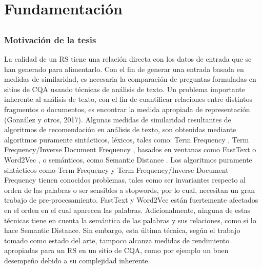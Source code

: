 \chapter*{Fundamentación}\label{ch:fundamentacion}

\section*{}
\addtocounter{section}{1}
\setcounter{subsection}{0}

\subsection{Motivación de la tesis}
 La calidad de un RS tiene una relación directa con los datos de entrada que se han generado para alimentarlo. Con el fin de generar una entrada basada en medidas de similaridad, es necesaria la comparación de preguntas formuladas en sitios de CQA usando técnicas de análisis de texto. Un problema importante inherente al análisis de texto, con el fin de cuantificar relaciones entre distintos fragmentos o documentos, es encontrar la medida apropiada de representación (González y otros, 2017). Algunas medidas de similaridad resultantes de algoritmos de recomendación en análisis de texto, son obtenidas mediante algoritmos puramente sintácticos, léxicos, tales como: Term Frequency \citep{salton5mcgill}, Term Frequency/Inverse Document Frequency \citep{baeza1999modern}, basados en ventanas como FastText \citep{joulin2016fasttext} o Word2Vec \citep{mikolov2013efficient}, o semánticos, como Semantic Distance \citep{li2006sentence}. Los algoritmos puramente sintácticos como Term Frequency y Term Frequency/Inverse Document Frequency tienen conocidos problemas, tales como ser invariantes respecto al orden de las palabras o ser sensibles a stopwords, por lo cual, necesitan un gran trabajo de pre-procesamiento. FastText y Word2Vec están fuertemente afectados en el orden en el cual aparecen las palabras. Adicionalmente, ninguna de estas técnicas tiene en cuenta la semántica de las palabras y sus relaciones, como si lo hace Semantic Distance. Sin embargo, esta última técnica, según el trabajo tomado como estado del arte, tampoco alcanza medidas de rendimiento apropiadas para un RS en un sitio de CQA, como por ejemplo un buen desempeño debido a su complejidad inherente.

